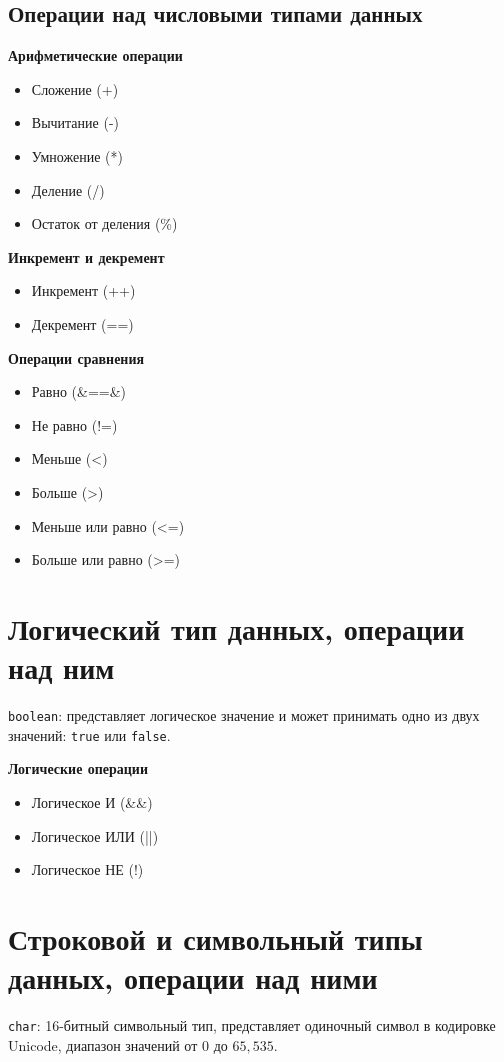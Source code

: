 \documentclass[12pt, a4paper]{article}
\begin{document}
\subsection*{Операции над числовыми типами данных}
\textbf{Арифметические операции}
\begin{itemize}
    \item Сложение (+)
    \item Вычитание (-)
    \item Умножение (*)
    \item Деление (/)
    \item Остаток от деления (\%)
\end{itemize}

\textbf{Инкремент и декремент}
\begin{itemize}
    \item Инкремент (++)
    \item Декремент (==)
\end{itemize}

\textbf{Операции сравнения}
\begin{itemize}
    \item Равно (&==&)
    \item Не равно (!=)
    \item Меньше (<)
    \item Больше (>)
    \item Меньше или равно (<=)
    \item Больше или равно (>=)
\end{itemize}

\section{Логический тип данных, операции над ним}
\texttt{boolean}: представляет логическое значение и может принимать одно из двух значений: \texttt{true} или \texttt{false}.

\textbf{Логические операции}
\begin{itemize}
    \item Логическое И (\&\&)
    \item Логическое ИЛИ (||)
    \item Логическое НЕ (!)
\end{itemize}


\section{Строковой и символьный типы данных, операции над ними}
\texttt{char}: 16-битный символьный тип, представляет одиночный символ в кодировке Unicode, диапазон значений от $0$ до $65,535$.
\end{document}
